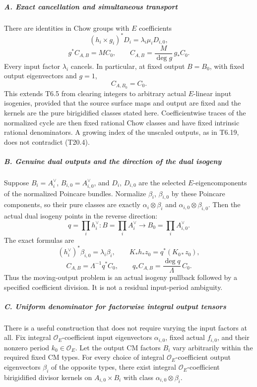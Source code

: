 \subparagraph{A. Exact cancellation and simultaneous transport}\label{a.-exact-cancellation-and-simultaneous-transport}

There are identities in Chow groups with \(E\) coefficients \[
 (h_i\times g_i)^*D_i=\lambda_i\mu_iD_{i,0},
 \tag{T20.2}
\] \[
 g^*C_{A,B}=M C_0,
 \qquad
 C_{A,B}=\frac{M}{\deg g}\,g_*C_0.
 \tag{T20.3}
\] Every input factor \(\lambda_i\) cancels. In particular, at fixed output \(B=B_0\), with fixed output eigenvectors and \(g=1\), \[
 C_{A,B_0}=C_0.
 \tag{T20.4}
\] This extends T6.5 from clearing integers to arbitrary actual \(E\)-linear input isogenies, provided that the source surface maps and output are fixed and the kernels are the pure birigidified classes stated here. Coefficientwise traces of the normalized cycle are then fixed rational Chow classes and have fixed intrinsic rational denominators. A growing index of the unscaled outputs, as in T6.19, does not contradict (T20.4).

\subparagraph{B. Genuine dual outputs and the direction of the dual isogeny}\label{b.-genuine-dual-outputs-and-the-direction-of-the-dual-isogeny}

Suppose \(B_i=A_i^\vee\), \(B_{i,0}=A_{i,0}^\vee\), and \(D_i\), \(D_{i,0}\) are the selected \(E\)-eigencomponents of the normalized Poincare bundles. Normalize \(\beta_i\), \(\beta_{i,0}\) by these Poincare components, so their pure classes are exactly \(\alpha_i\otimes\beta_i\) and \(\alpha_{i,0}\otimes\beta_{i,0}\). Then the actual dual isogeny points in the reverse direction: \[
 q=\prod_i h_i^\vee:B=\prod_iA_i^\vee
                      \longrightarrow B_0=\prod_iA_{i,0}^\vee.
\] The exact formulas are \[
 (h_i^\vee)^*\beta_{i,0}=\lambda_i\beta_i,
 \qquad
 K_*h_*z_0=q^*(K_{0*}z_0),
 \tag{T20.5}
\] \[
 C_{A,B}=\Lambda^{-1}q^*C_0,
 \qquad
 q_*C_{A,B}=\frac{\deg q}{\Lambda}\,C_0.
 \tag{T20.6}
\] Thus the moving-output problem is an actual isogeny pullback followed by a specified coefficient division. It is not a residual input-period ambiguity.

\subparagraph{C. Uniform denominator for factorwise integral output tensors}\label{c.-uniform-denominator-for-factorwise-integral-output-tensors}

There is a useful construction that does not require varying the input factors at all. Fix integral \(\mathcal O_E\)-coefficient input eigenvectors \(\alpha_{i,0}\), fixed actual \(f_{i,0}\), and their nonzero period \(k_0\in\mathcal O_E\). Let the output CM factors \(B_i\) vary arbitrarily within the required fixed CM types. For every choice of integral \(\mathcal O_E\)-coefficient output eigenvectors \(\beta_i\) of the opposite types, there exist integral \(\mathcal O_E\)-coefficient birigidified divisor kernels on \(A_{i,0}\times B_i\) with class \(\alpha_{i,0}\otimes\beta_i\).

